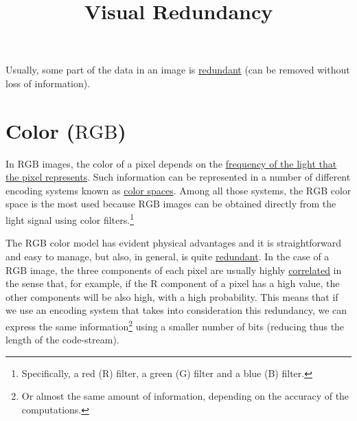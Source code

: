 
\title{Visual Redundancy}

\maketitle
\tableofcontents

Usually, some part of the data in an image is
\href{https://en.wikipedia.org/wiki/Data_redundancy}{redundant} (can
be removed without loss of information).


\section{Color ($\text{RGB}$)}
In $\text{RGB}$ images, the color of a pixel depends on the
\href{https://en.wikipedia.org/wiki/Visible_spectrum}{frequency of the
  light that the pixel represents}. Such information can be
represented in a number of different encoding systems known as
\href{https://en.wikipedia.org/wiki/Color_space}{color spaces}. Among
all those systems, the $\text{RGB}$ color space is the most used
because $\text{RGB}$ images can be obtained directly from the light
signal using color filters.\footnote{Specifically, a red (R) filter, a
green (G) filter and a blue (B) filter.}

The $\text{RGB}$ color model has evident physical advantages and it is
straightforward and easy to manage, but also, in general, is quite
\href{https://en.wikipedia.org/wiki/Data_redundancy}{redundant}. In
the case of a $\text{RGB}$ image, the three components of each pixel
are usually highly
\href{https://en.wikipedia.org/wiki/Correlation_and_dependence}{correlated}
in the sense that, for example, if the $\text{R}$ component of a pixel
has a high value, the other components will be also high, with a high
probability. This means that if we use an encoding system that takes
into consideration this redundancy, we can express the same
information\footnote{Or almost the same amount of information,
depending on the accuracy of the computations.} using a smaller number
of bits (reducing thus the length of the code-stream).

